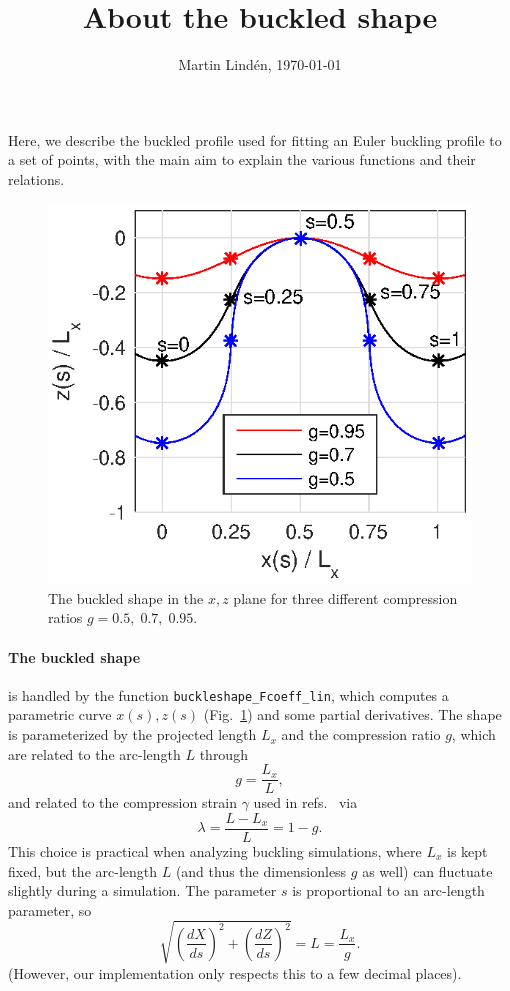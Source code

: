 \documentclass[11pt,a4paper,twocolumn]{article}
\title{About the buckled shape}
\author{Martin Lind\'en,  \today}
\date{}
\begin{document}
\maketitle 
Here, we describe the buckled profile used for fitting an Euler
buckling profile to a set of points, with the main aim to explain the
various functions and their relations.

\begin{figure}
  \includegraphics{figures/buckledshape.eps}
  \caption{\label{fig:buckle} The buckled shape in the $x,z$ plane for
    three different compression ratios $g=0.5,\;0.7,\;0.95$.}
\end{figure}
\paragraph{The buckled shape}
is handled by the function \texttt{buckleshape\_Fcoeff\_lin}, which
computes a parametric curve $x(s),z(s)$ (Fig.~\ref{fig:buckle}) and
some partial derivatives. The shape is parameterized by the projected
length $L_x$ and the compression ratio $g$, which are related to the
arc-length $L$ through
\begin{equation}
  g=\frac{L_x}{L},
\end{equation}
and related to the compression strain $\gamma$ used in
refs.~\cite{gomez2016,hu2013} via
\begin{equation}
  \lambda=\frac{L-L_x}{L}=1-g.
\end{equation}
This choice is practical when analyzing buckling simulations, where
$L_x$ is kept fixed, but the arc-length $L$ (and thus the dimensionless
$g$ as well) can fluctuate slightly during a simulation. The parameter
$s$ is proportional to an arc-length parameter, so 
\begin{equation}
  \sqrt{\left(\frac{dX}{ds}\right)^2+\left(\frac{dZ}{ds}\right)^2}
  =L=\frac{L_x}{g}.
\end{equation}
(However, our implementation only respects this to a few decimal
places).
\end{document}
